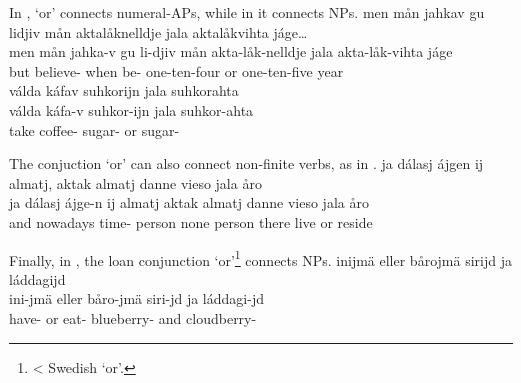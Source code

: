 In ,  ‘or’ connects numeral-APs, while in  it connects NPs. 
\ea\label{conjunctionEx3}%
\glll	men mån jahkav gu lidjiv mån aktalåknelldje jala aktalåkvihta jáge…\\
	men mån jahka-v gu li-djiv mån akta-låk-nelldje jala akta-låk-vihta jáge\\
	but  believe- when be-  one-ten-four or one-ten-five year\BS{}\\\nopagebreak
{}	
\z
\ea\label{conjunctionEx4}%
\glll	válda káfav suhkorijn jala suhkorahta\\
	válda káfa-v suhkor-ijn jala suhkor-ahta\\
	take\BS{} coffee- sugar- or sugar-\\\nopagebreak
{}	
\z

The conjuction  ‘or’ can also connect non-finite verbs, as in . 
\ea\label{conjunctionEx5}%
\glll	ja dálasj ájgen ij almatj, aktak almatj danne vieso jala åro\\
	ja dálasj ájge-n ij almatj aktak almatj danne vieso jala åro\\
	and nowadays time- \BS{} person\BS{} none person\BS{} there live\BS{} or reside\BS{}\\\nopagebreak
{}	
\z

Finally, in , the loan conjunction  ‘or’\footnote{< Swedish  ‘or’.} connects NPs. 
\ea\label{conjunctionEx6}%
\glll	inijmä eller bårojmä sirijd ja láddagijd\\
	ini-jmä eller båro-jmä siri-jd ja láddagi-jd\\
	have- or eat- blueberry- and cloudberry-\\\nopagebreak
{}	
\z
{}

